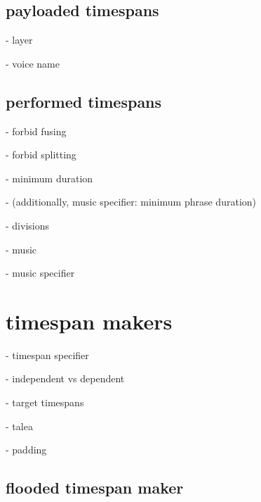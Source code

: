 \begin{comment}
<abjad>
performed_timespan = consort.PerformedTimespan(
    layer=1,
    minimum_duration=Duration(1, 8),
    music_specifier=consort.MusicSpecifier(),
    start_offset=Offset(1, 4),
    stop_offset=Offset(2, 1),
    voice_name='Violin 1 LH Voice',
    )
</abjad>
\end{comment}

\begin{comment}
<abjad>
silent_timespan = consort.SilentTimespan(
    layer=2,
    start_offset=Offset(0, 1),
    stop_offset=Offset(1, 4),
    voice_name='Violin 1 LH Voice',
    )
</abjad>
\end{comment}

\subsection{payloaded timespans}

- layer

- voice name

\subsection{performed timespans}

- forbid fusing

- forbid splitting

- minimum duration

- (additionally, music specifier: minimum phrase duration)

- divisions

- music

- music specifier

\section{timespan makers}

- timespan specifier

- independent vs dependent

- target timespans

- talea

- padding

\subsection{flooded timespan maker}

\begin{comment}
<abjad>
flooded_timespan_maker = consort.FloodedTimespanMaker()
print(format(flooded_timespan_maker))
</abjad>
\end{comment}


